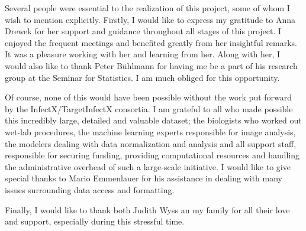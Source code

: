 Several people were essential to the realization of this project, some of whom I wish to mention explicitly. Firstly, I would like to express my gratitude to Anna Drewek for her support and guidance throughout all stages of this project. I enjoyed the frequent meetings and benefited greatly from her insightful remarks. It was a pleasure working with her and learning from her. Along with her, I would also like to thank Peter B\"uhlmann for having me be a part of his research group at the Seminar for Statistics. I am much obliged for this opportunity.

Of course, none of this would have been possible without the work put forward by the InfectX/TargetInfectX consortia. I am grateful to all who made possible this incredibly large, detailed and valuable dataset; the biologists who worked out wet-lab procedures, the machine learning experts responsible for image analysis, the modelers dealing with data normalization and analysis and all support staff, responsible for securing funding, providing computational resources and handling the administrative overhead of such a large-scale initiative. I would like to give special thanks to Mario Emmenlauer for his assistance in dealing with many issues surrounding data access and formatting.

Finally, I would like to thank both Judith Wyss an my family for all their love and support, especially during this stressful time.
